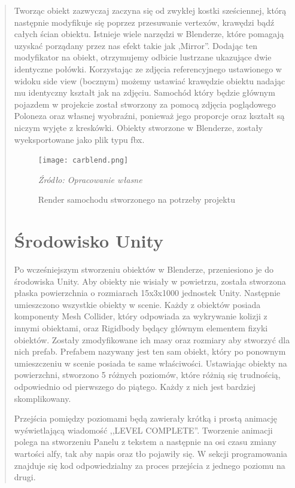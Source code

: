 \begin{quotation}
\indent Tworząc obiekt zazwyczaj zaczyna się od zwykłej kostki sześciennej, którą następnie modyfikuje się poprzez przesuwanie vertexów, krawędzi bądź całych ścian obiektu. Istnieje wiele narzędzi w Blenderze, które pomagają uzyskać porządany przez nas efekt takie jak ,Mirror''. Dodając ten modyfikator na obiekt, otrzymujemy odbicie lustrzane ukazujące dwie identyczne połówki. Korzystając ze zdjęcia referencyjnego ustawionego w widoku side view (bocznym) możemy ustawiać krawędzie obiektu nadając mu identyczny kształt jak na zdjęciu. Samochód który będzie głównym pojazdem w projekcie został stworzony za pomocą zdjęcia poglądowego Poloneza oraz własnej wyobraźni, ponieważ jego proporcje oraz kształt są niczym wyjęte z kreskówki. Obiekty stworzone w Blenderze, zostały wyeksportowane jako plik typu fbx.

\begin{figure}[!hbt]
\centering
  \texttt{[image: carblend.png]}
  \caption{Render samochodu stworzonego na potrzeby projektu}\label{rys_2}
  \begin{minipage}[t]{0.75\linewidth}
    \emph{Źródło: Opracowanie własne}
  \end{minipage}
\end{figure}

\newpage
\section{Środowisko Unity}
\indent Po wcześniejszym stworzeniu obiektów w Blenderze, przeniesiono je do środowiska Unity. Aby obiekty nie wisiały w powietrzu, została stworzona płaska powierzchnia o rozmiarach 15x3x1000 jednostek Unity. Następnie umieszczono wszystkie obiekty w scenie. Każdy z obiektów posiada komponenty Mesh Collider, który odpowiada za wykrywanie kolizji z innymi obiektami, oraz Rigidbody będący głównym elementem fizyki obiektów.  Zostały zmodyfikowane ich masy oraz rozmiary aby stworzyć dla nich prefab. Prefabem nazywany jest ten sam obiekt, który po ponownym umieszczeniu w scenie posiada te same właściwości. Ustawiając obiekty na powierzchni, stworzono 5 różnych poziomów, które różnią się trudnością, odpowiednio od pierwszego do piątego. Każdy z nich jest  bardziej skomplikowany. 

\indent Przejścia pomiędzy poziomami będą zawierały krótką i prostą animację wyświetlającą wiadomość ,,LEVEL COMPLETE''. Tworzenie animacji polega na stworzeniu Panelu z tekstem a następnie na osi czasu zmiany wartości alfy, tak aby napis oraz tło pojawiły się. W sekcji programowania znajduje się kod odpowiedzialny za proces przejścia z jednego poziomu na drugi. 


\end{quotation}
